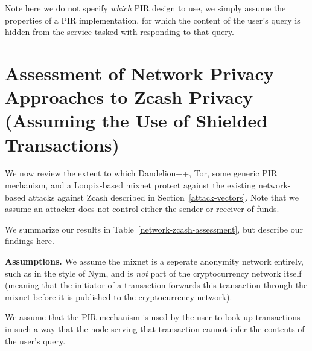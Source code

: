 \documentclass{article}
\begin{document}
Note here we do not specify \emph{which} PIR design to use, we simply assume
the properties of a PIR implementation, for which the content of the user's
query is hidden from the service tasked with responding to that query.


\section{Assessment of Network Privacy Approaches to Zcash Privacy (Assuming
the Use of Shielded Transactions)}
\label{network-privacy-assessment}

We now review the extent to which Dandelion++, Tor, some generic PIR mechanism,
and a Loopix-based mixnet
protect against the existing network-based attacks against Zcash described in
Section~\ref{attack-vectors}.
Note that we assume an attacker does not control either the sender or receiver
of funds.

We summarize our results in Table~\ref{network-zcash-assessment}, but describe
our findings here.

\textbf{Assumptions.} We assume the mixnet is a seperate anonymity network entirely, such as
in the style of Nym, and is \emph{not} part of the cryptocurrency network
itself (meaning that the initiator of a transaction forwards this transaction
through the mixnet before it is published to the cryptocurrency network).

We assume that the PIR mechanism is used by the user to look up transactions in
such a way that the node serving that transaction cannot infer the contents of
the user's query.
\end{document}
